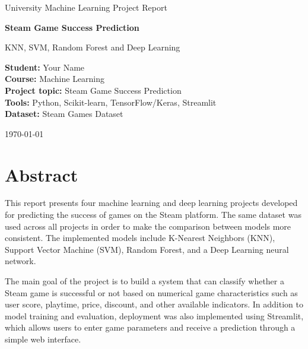 \documentclass[12pt,a4paper]{article}
\begin{document}
\begin{titlepage}
    \centering
    \vspace*{2cm}

    {\Large University Machine Learning Project Report\par}
    \vspace{1.5cm}

    {\Huge\bfseries Steam Game Success Prediction\par}
    \vspace{0.5cm}

    {\Large KNN, SVM, Random Forest and Deep Learning\par}

    \vfill

    \begin{flushleft}
    \textbf{Student:} Your Name \\
    \textbf{Course:} Machine Learning \\
    \textbf{Project topic:} Steam Game Success Prediction \\
    \textbf{Tools:} Python, Scikit-learn, TensorFlow/Keras, Streamlit \\
    \textbf{Dataset:} Steam Games Dataset
    \end{flushleft}

    \vfill

    {\large \today\par}
\end{titlepage}

\tableofcontents
\newpage

\section{Abstract}

This report presents four machine learning and deep learning projects developed for predicting the success of games on the Steam platform. The same dataset was used across all projects in order to make the comparison between models more consistent. The implemented models include K-Nearest Neighbors (KNN), Support Vector Machine (SVM), Random Forest, and a Deep Learning neural network.

The main goal of the project is to build a system that can classify whether a Steam game is successful or not based on numerical game characteristics such as user score, playtime, price, discount, and other available indicators. In addition to model training and evaluation, deployment was also implemented using Streamlit, which allows users to enter game parameters and receive a prediction through a simple web interface.
\end{document}
